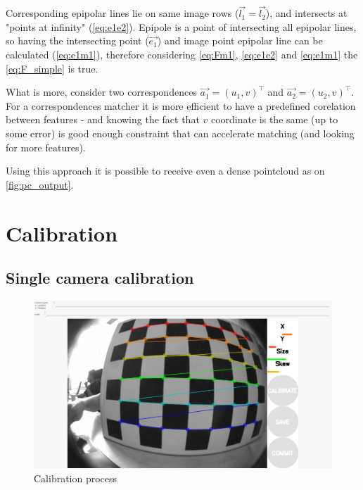 Corresponding epipolar lines lie on same image rows ($\vec{l_1} = \vec{l_2}$), and intersects at "points at infinity" (\autoref{eq:e1e2}). 
Epipole is a point of intersecting all epipolar lines, so having the intersecting point ($\vec{e_1}$) and image point epipolar line can be calculated (\autoref{eq:e1m1}), therefore considering \autoref{eq:Fm1}, \autoref{eq:e1e2} and \autoref{eq:e1m1} the \autoref{eq:F_simple} is true.

What is more, consider two correspondences $\vec{a_1} = (u_1, v)^\top$ and $\vec{a_2} = (u_2, v)^\top $. For a correspondences matcher it is more efficient to have a predefined corelation between features - and knowing the fact that $v$ coordinate is the same (up to some error) is good enough constraint that can accelerate matching (and looking for more features).

Using this approach it is possible to receive even a dense pointcloud as on \autoref{fig:pc_output}.


\section{Calibration}
\subsection{Single camera calibration}

\begin{figure}[h]
    \centering
    \includegraphics[width=.6\textwidth]{graphics/calibration.png}
    \caption{Calibration process}
    \label{fig:calib}
\end{figure}

